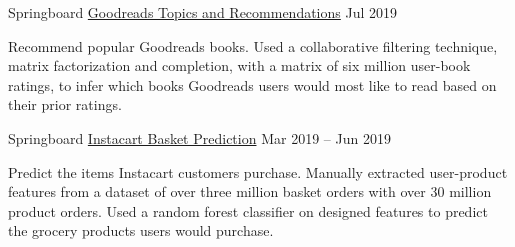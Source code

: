 

\begin{cventries}

  \cventry
    {Springboard} %
    {\href{https://github.com/eitamaton/goodreads}{Goodreads Topics and Recommendations}} %
    {} %
    {Jul 2019} %
    {
      \begin{cvparagraph}
        Recommend popular Goodreads books. Used a collaborative filtering technique, matrix factorization and completion, with a matrix of six million user-book ratings, to infer which books Goodreads users would most like to read based on their prior ratings. \vspace{-5mm}
      \end{cvparagraph}
    }
  \cventry
    {Springboard} %
    {\href{https://github.com/eitamaton/instacart}{Instacart Basket Prediction}} %
    {} %
    {Mar 2019 -- Jun 2019} %
    {
      \begin{cvparagraph}
        Predict the items Instacart customers purchase. Manually extracted user-product features from a dataset of over three million basket orders with over 30 million product orders. Used a random forest classifier on designed features to predict the grocery products users would purchase.\vspace{-5mm}
      \end{cvparagraph}
    }
\vspace{-8pt}
\end{cventries}
